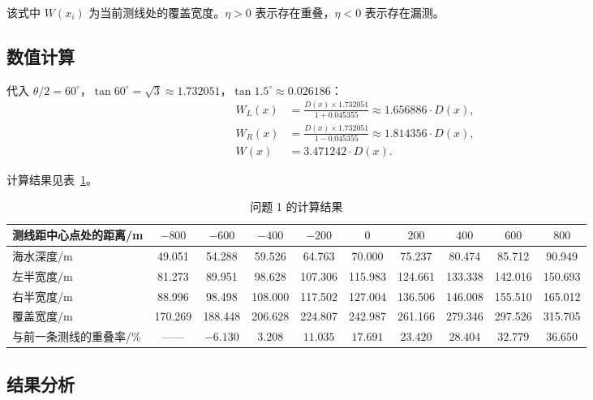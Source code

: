 \documentclass[12pt,a4paper]{ctexart}
\begin{document}
 该式中 $W(x_i)$ 为当前测线处的覆盖宽度。$\eta > 0$ 表示存在重叠，$\eta < 0$ 表示存在漏测。
 
 \subsection{数值计算}
 
 代入 $\theta/2 = 60^\circ$，$\tan 60^\circ = \sqrt{3} \approx 1.732051$，$\tan 1.5^\circ \approx 0.026186$：
 \[
     \begin{aligned}
     W_L(x) &= \frac{D(x) \times 1.732051}{1 + 0.045355} \approx 1.656886 \cdot D(x), \\[2mm]
     W_R(x) &= \frac{D(x) \times 1.732051}{1 - 0.045355} \approx 1.814356 \cdot D(x), \\[2mm]
     W(x)  &= 3.471242 \cdot D(x).
     \end{aligned}
 \]
 
 计算结果见表~\ref{tab:result1}。
 
 \begin{table}[htbp]
 \centering
 \caption{问题 1 的计算结果}
 \label{tab:result1}
 \begin{tabular}{lccccccccc}
 \toprule
 测线距中心点处的距离/m & $-800$ & $-600$ & $-400$ & $-200$ & $0$ & $200$ & $400$ & $600$ & $800$ \\
 \midrule
 海水深度/m    & 49.051 & 54.288 & 59.526 & 64.763 & 70.000 & 75.237 & 80.474 & 85.712 & 90.949 \\
 左半宽度/m    & 81.273 & 89.951 & 98.628 & 107.306 & 115.983 & 124.661 & 133.338 & 142.016 & 150.693 \\
 右半宽度/m    & 88.996 & 98.498 & 108.000 & 117.502 & 127.004 & 136.506 & 146.008 & 155.510 & 165.012 \\
 覆盖宽度/m    & 170.269 & 188.448 & 206.628 & 224.807 & 242.987 & 261.166 & 279.346 & 297.526 & 315.705 \\
 与前一条测线的重叠率/\% &  —— & $-6.130$ & $3.208$ & $11.035$ & $17.691$ & $23.420$ & $28.404$ & $32.779$ & $36.650$ \\
 \bottomrule
 \end{tabular}
 \end{table}
 
 \subsection{结果分析}
 
\end{document}
